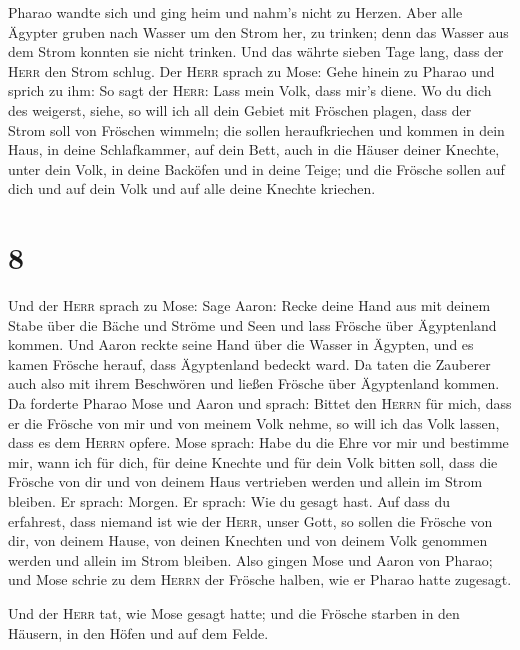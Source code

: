 Pharao wandte sich und ging heim und nahm's nicht zu Herzen.
 Aber alle Ägypter gruben nach Wasser um den Strom her,
zu trinken; denn das Wasser aus dem Strom konnten sie nicht trinken.
 Und das währte sieben Tage lang, dass der \textsc{Herr}
den Strom schlug.  Der \textsc{Herr} sprach zu Mose: Gehe
hinein zu Pharao und sprich zu ihm: So sagt der \textsc{Herr}: Lass mein
Volk, dass mir's diene.  Wo du dich des weigerst, siehe,
so will ich all dein Gebiet mit Fröschen plagen,  dass
der Strom soll von Fröschen wimmeln; die sollen heraufkriechen und
kommen in dein Haus, in deine Schlafkammer, auf dein Bett, auch in die
Häuser deiner Knechte, unter dein Volk, in deine Backöfen und in deine
Teige;  und die Frösche sollen auf dich und auf dein Volk
und auf alle deine Knechte kriechen.

\hypertarget{section-7}{%
\section{8}\label{section-7}}

 Und der \textsc{Herr} sprach zu Mose: Sage Aaron: Recke
deine Hand aus mit deinem Stabe über die Bäche und Ströme und Seen und
lass Frösche über Ägyptenland kommen.  Und Aaron reckte
seine Hand über die Wasser in Ägypten, und es kamen Frösche herauf, dass
Ägyptenland bedeckt ward.  Da taten die Zauberer auch also
mit ihrem Beschwören und ließen Frösche über Ägyptenland kommen.
 Da forderte Pharao Mose und Aaron und sprach: Bittet den
\textsc{Herrn} für mich, dass er die Frösche von mir und von meinem Volk
nehme, so will ich das Volk lassen, dass es dem \textsc{Herrn} opfere.
 Mose sprach: Habe du die Ehre vor mir und bestimme mir,
wann ich für dich, für deine Knechte und für dein Volk bitten soll, dass
die Frösche von dir und von deinem Haus vertrieben werden und allein im
Strom bleiben.  Er sprach: Morgen. Er sprach: Wie du
gesagt hast. Auf dass du erfahrest, dass niemand ist wie der
\textsc{Herr}, unser Gott,  so sollen die Frösche von dir,
von deinem Hause, von deinen Knechten und von deinem Volk genommen
werden und allein im Strom bleiben.  Also gingen Mose und
Aaron von Pharao; und Mose schrie zu dem \textsc{Herrn} der Frösche
halben, wie er Pharao hatte zugesagt.

 Und der \textsc{Herr} tat, wie Mose gesagt hatte; und die
Frösche starben in den Häusern, in den Höfen und auf dem Felde.


